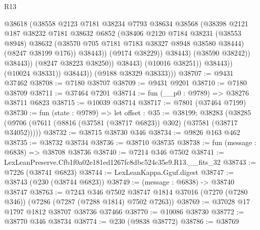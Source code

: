 \begin{lexlean}{R13}
\begin{coremodule}
                                  @38618
                                  (@38558
                                    @2123
                                    @7181
                                    @38234
                                    @7793
                                    @38634
                                    @38568
                                    (@38398
                                      @2121
                                      @187
                                      @38232
                                      @7181
                                      @38632
                                      @6852
                                      (@38406
                                        @2120
                                        @7184
                                        @38231
                                        (@38553 @8948)
                                        @38632
                                        (@38570 @705 @7181 @7183 @38327 @8948 @38580 @38444)
                                        (@8247 @38199 @176))
                                      @38443))
                                  (@9174 @38229))
                                @38443)
                              (@38590 @38242))
                            @38443))
                        (@8247 @38223 @38250))
                      @38443)
                    (@10016 @38251))
                  @38443))
              (@10024 @38331))
            @38443))
        (@9188 @38329 @38333)))
@38707 := @9431 @37462
@38708 := @7180 @38707
@38709 := @9431 @9201
@38710 := @7180 @38709
@38711 := @37464 @7201
@38714 := fun (__p0 : @9789) => @38276 @38711 @6823
@38715 := @10039 @38714
@38717 := @7801 (@37464 @7199)
@38730 := fun (state : @9789) =>
  let offset : @35 := @38199;
  @38283 (@38285 (@9706 (@7611 (@8816 (@37581 (@38717 @6823)) @302) (@37581 (@38717 @34052)))))
@38732 := @38715 @38730 @346
@38734 := @9826 @163 @462
@38735 := @38732 @38734
@38736 := @38710 @38735
@38738 := fun (message : @6838) => @38708 @38736
@38740 := @7214 @346 @7502
@38741 := LexLeanPreserve.Cfb1f0a02e181ed1267fc8dbc524c35e9.R13.__fits_32
@38743 := @7226 (@38741 @6823)
@38744 := LexLeanKappa.Gguf.digest
@38747 := @38743 (@230 (@38744 @6823))
@38749 := (message : @6838) -> @38740 @38747
@38763 := @7243
    @346
    @7502
    @38747
    @1814
    @37016
    (@7270 (@7280 @346))
    (@7286 (@7287 (@7288 @1814) @7502 @7263))
@38769 := @37028 @17 @1797 @1812 @38707 @38736 @37466
@38770 := @10086 @38730
@38772 := @38770 @346 @38734
@38774 := @230 (@9838 @38772)
@38786 := @38769

\end{coremodule}
\end{lexlean}
